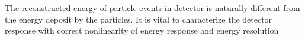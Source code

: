 The reconstructed energy of particle events in detector is naturally different from the energy deposit by the particles. It is vital to characterize the detector response with correct  nonlinearity of energy response and energy resolution 

